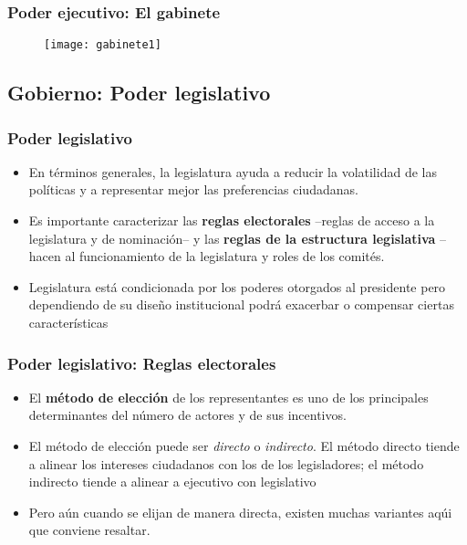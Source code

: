 \documentclass[14pt,aspectratio=169]{beamer}
\begin{document}
      
\begin{frame}\frametitle{Poder ejecutivo: El gabinete}
 \begin{figure}[htbp]\vspace{0cm}
    \centering
    \texttt{[image: gabinete1]}
    \label{fig:1}
  \end{figure}
        \end{frame}


        
 \subsection{Gobierno:  Poder legislativo}

 
  \begin{frame}\frametitle{Poder legislativo}
    \begin{itemize}
    \item En términos generales, la legislatura ayuda a reducir la
      volatilidad de las políticas y a representar mejor las
      preferencias ciudadanas.
      \item Es importante caracterizar las \textbf{reglas
          electorales} --reglas de acceso a la legislatura y de
        nominación-- y las \textbf{reglas de la estructura
          legislativa} --hacen al funcionamiento de la legislatura y
        roles de los comités.
        \item Legislatura está condicionada por los
          poderes otorgados al presidente pero dependiendo de su
          diseño institucional podrá exacerbar o compensar ciertas características
    \end{itemize}
    \end{frame}


    \begin{frame}\frametitle{Poder legislativo: Reglas electorales}
    \begin{itemize}
    \item El \textbf{método de elección} de los representantes es uno
      de los principales determinantes del número de actores y de sus
      incentivos.
      \item El método de elección puede ser \textit{directo} o
        \textit{indirecto}. El método directo tiende a alinear los
        intereses ciudadanos con los de los legisladores; el método
        indirecto tiende a alinear a ejecutivo con legislativo
        \item Pero aún cuando se elijan de manera directa, existen
          muchas variantes aqúi que conviene resaltar. 
    \end{itemize}
    \end{frame}
\end{document}
